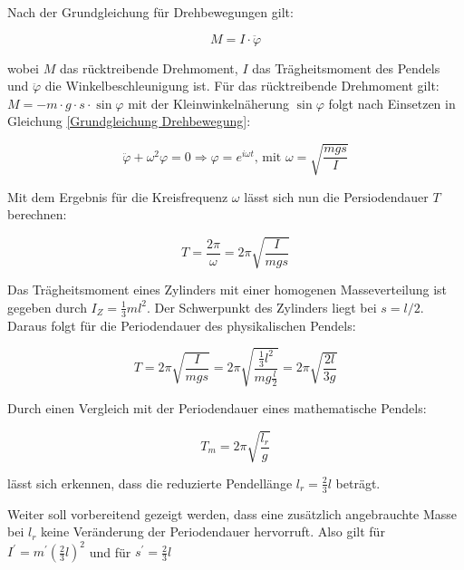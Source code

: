 Nach der Grundgleichung für Drehbewegungen gilt:

\begin{equation} \label{Grundgleichung Drehbewegung}
    M = I \cdot \ddot{\varphi}
\end{equation}

wobei $M$ das rücktreibende Drehmoment, $I$ das Trägheitsmoment des Pendels und $\ddot{\varphi}$ die Winkelbeschleunigung ist. Für das rücktreibende Drehmoment gilt: $M = -m \cdot g \cdot s \cdot \sin{\varphi}$ mit der Kleinwinkelnäherung $\sin{\varphi}$ folgt nach Einsetzen in Gleichung \ref{Grundgleichung Drehbewegung}:

\begin{equation} \label{Schwingungsgleichung eines physikalischen Pendels}
\ddot{\varphi} + \omega^2\varphi = 0
\Rightarrow \varphi = e^{i \omega t} \text{, mit } \omega = \sqrt{\frac{mgs}{I}}
\end{equation}

Mit dem Ergebnis für die Kreisfrequenz $\omega$ lässt sich nun die Persiodendauer $T$ berechnen:

\begin{equation}
    T = \frac{2\pi}{\omega} = 2 \pi \sqrt{\frac{I}{mgs}}
\end{equation}

Das Trägheitsmoment eines Zylinders mit einer homogenen Masseverteilung ist gegeben durch $I_Z = \frac{1}{3} ml^2$. Der Schwerpunkt des Zylinders liegt bei $s = l/2$. Daraus folgt für die Periodendauer des physikalischen Pendels:

\begin{equation}
    T = 2 \pi \sqrt{\frac{I}{mgs}} = 2 \pi \sqrt{\frac{\frac{1}{3} l^2}{mg\frac{l}{2}}} = 2 \pi \sqrt{\frac{2l}{3g}}
\end{equation}

Durch einen Vergleich mit der Periodendauer eines mathematische Pendels:

\begin{equation} \label{Periodendauer mathematisches Pendel}
   T_m = 2 \pi \sqrt{\frac{l_r}{g}} 
\end{equation} 

lässt sich erkennen, dass die reduzierte Pendellänge $l_r = \frac{2}{3}l$ beträgt.

Weiter soll vorbereitend gezeigt werden, dass eine zusätzlich angebrauchte Masse bei $l_r$  keine Veränderung der Periodendauer hervorruft. Also gilt für $I^\prime = m^\prime (\frac{2}{3}l)^2$ und für $s^\prime = \frac{2}{3}l$

